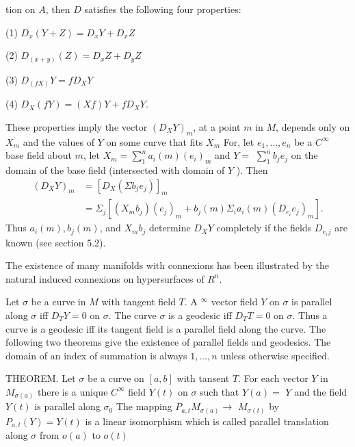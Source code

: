 \documentclass[10pt]{article}
\begin{document}
tion on $A$, then $D$ satisfies the following four properties:

(1) $D_{x}(Y+Z)=D_{x} Y+D_{x} Z$

(2) $D_{(x+y)}(Z)=D_{x} Z+D_{y} Z$

(3) $D_{(f X)} Y=f D_{X} Y$

(4) $D_{X}(f Y)=(X f) Y+f D_{X} Y$.

These properties imply the vector $\left(D_{X} Y\right)_{m}$, at a point $m$ in $M$, depends only on $X_{m}$ and the values of $Y$ on some curve that fits $X_{m}$ For, let $e_{1}, \ldots, e_{n}$ be a $C^{\infty}$ base field about $m$, let $X{ }_{m}=\sum_{1}^{n} a_{i}(m)\left(e_{i}\right)_{m}$ and $Y=$ $\sum_{1}^{n} b_{j} e_{j}$ on the domain of the base field (intersected with domain of $Y$ ). Then
$$
\begin{aligned}
\left(D_{X} Y\right)_{m} &=\left[D_{X}\left(\Sigma b_{j} e_{j}\right)\right]_{m} \\
&=\Sigma_{j}\left[\left(X_{m} b_{j}\right)\left(e_{j}\right)_{m}+b_{j}(m) \Sigma_{i} a_{i}(m)\left(D_{e_{i}} e_{j}\right)_{m}\right] .
\end{aligned}
$$
Thus $a_{i}(m), b_{j}(m)$, and $X_{m} b_{j}$ determine $D_{X} Y$ completely if the fields $D_{e_{i}}{ }_{j}$ are known (see section 5.2).

The existence of many manifolds with connexions has been illustrated by the natural induced connexions on hypersurfaces of $R^{n}$.

Let $\sigma$ be a curve in $M$ with tangent field $T .$ A $^{\infty}$ vector field $Y$ on $\sigma$ is parallel along $\sigma$ iff $D_{T} Y=0$ on $\sigma$. The curve $\sigma$ is a geodesic iff $D_{T} T=0$ on $\sigma .$ Thus a curve is a geodesic iff its tangent field is a parallel field along the curve. The following two theorems give the existence of parallel fields and geodesics. The domain of an index of summation is always $1, \ldots, n$ unless otherwise specified.

THEOREM. Let $\sigma$ be a curve on $[a, b]$ with tansent $T$. For each vector $Y$ in $M_{\sigma(a)}$ there is a unique $C^{\infty}$ field $Y(t)$ on $\sigma$ such that $Y(a)=$ $Y$ and the field $Y(t)$ is parallel along $\sigma_{0}$ The mapping $P_{a, t} M_{\sigma(a)} \rightarrow$ $M_{\sigma(t)}$ by $P_{a, t}(Y)=Y(t)$ is a linear isomorphism which is called parallel translation along $\sigma$ from $o(a)$ to $o(t)$
\end{document}
